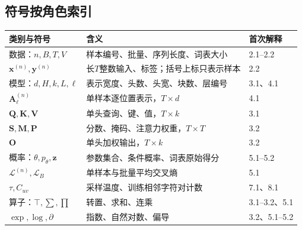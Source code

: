 \documentclass[UTF8,a4paper,11pt,fontset=fandol]{ctexart}
\begin{document}
\subsection{符号按角色索引}
\par\noindent\begin{tabularx}{\linewidth}{L{2.7cm}Y L{1.9cm}}\toprule
类别与符号 & 含义 & 首次解释\\\midrule
数据：$n,B,T,V$ & 样本编号、批量、序列长度、词表大小 & 2.1--2.2\\
$\mathbf x^{(n)},\mathbf y^{(n)}$ & 长$T$整数输入、标签；括号上标只表示样本 & 2.2\\
模型：$d,H,k,L,\ell$ & 表示宽度、头数、头宽、块数、层编号 & 3.1、4.1\\
$\mathbf A_\ell^{(n)}$ & 单样本逐位置表示，$T\times d$ & 4.1\\
$\mathbf Q,\mathbf K,\mathbf V$ & 单头查询、键、值，$T\times k$ & 3.1\\
$\mathbf S,\mathbf M,\mathbf P$ & 分数、掩码、注意力权重，$T\times T$ & 3.2\\
$\mathbf O$ & 单头加权输出，$T\times k$ & 3.2\\
概率：$\theta,p_\theta,\mathbf z$ & 参数集合、条件概率、词表原始得分 & 5.1--5.2\\
$\mathcal L^{(n)},\mathcal L_B$ & 单样本与批量平均交叉熵 & 5.1\\
$\tau,C_{uv}$ & 采样温度、训练相邻字符对计数 & 7.1、8.1\\
算子：$\top,\sum,\prod$ & 转置、求和、连乘 & 3.1--3.2、5.1\\
$\exp,\log,\partial$ & 指数、自然对数、偏导 & 3.2、5.1--5.2\\\bottomrule
\end{tabularx}\par
\end{document}
